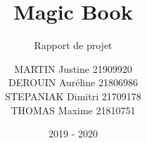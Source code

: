 \documentclass[report]{BetterDocument}
\title{Magic Book}
\subtitle{Rapport de projet}
\author{MARTIN Justine 21909920\\
	DEROUIN Auréline 21806986\\
	STEPANIAK Dimitri 21709178\\
	THOMAS Maxime 21810751
}
\date{2019 - 2020}
\institute{Unicaen}
\begin{document}
	\pageDeGarde

	\tableDesMatieres

	

	

	

	

	
\end{document}
